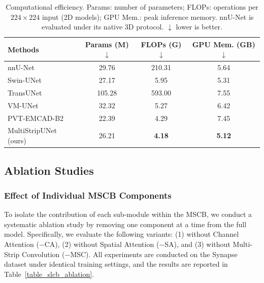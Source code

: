 \documentclass{llncs}
\begin{document}
\begin{table}[!htbp]
\centering
\footnotesize
\caption{Computational efficiency. Params: number of parameters; FLOPs: operations per $224\times224$ input (2D models); GPU Mem.: peak inference memory. nnU-Net is evaluated under its native 3D protocol. $\downarrow$ lower is better.}
\label{table_efficiency}
\begin{tabular}{l|ccc}
\hline
Methods & Params (M)$\downarrow$ & FLOPs (G)$\downarrow$ & GPU Mem. (GB)$\downarrow$ \\
\hline
nnU-Net              & 29.76  & 210.31 & 5.64 \\
Swin-UNet \cite{cao2021swinunet}   & 27.17  & 5.95   & 5.31 \\
TransUNet \cite{chen2021transunet} & 105.28 & 593.00 & 7.55 \\
VM-UNet \cite{ruan2024vmunet}      & 32.32  & 5.27   & 6.42 \\
PVT-EMCAD-B2 \cite{emcad2024}      & 22.39  & 4.29   & 7.45 \\
\hline
MultiStripUNet (ours) & 26.21 & \textbf{4.18} & \textbf{5.12} \\
\hline
\end{tabular}
\end{table}

\subsection{Ablation Studies}


\subsubsection{Effect of Individual MSCB Components}


To isolate the contribution of each sub-module within the MSCB, we conduct a systematic ablation study by removing one component at a time from the full model. Specifically, we evaluate the following variants: (1) without Channel Attention ($-$CA), (2) without Spatial Attention ($-$SA), and (3) without Multi-Strip Convolution ($-$MSC). All experiments are conducted on the Synapse dataset under identical training settings, and the results are reported in Table~\ref{table_slcb_ablation}.
\end{document}
